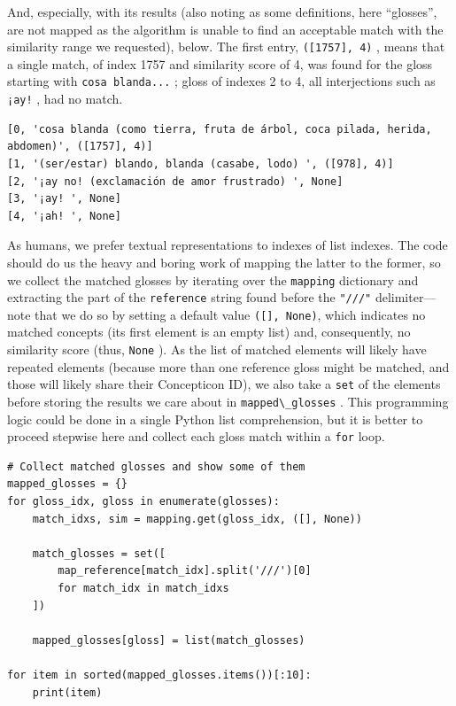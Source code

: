 \documentclass[
  a4paper,
  14pt,
  oneside,
  tablecaptionabove
]{scrbook}
\newcommand{\passthrough}[1]{#1}
\begin{document}
And, especially, with its results (also noting as some definitions, here
\enquote{glosses}, are not mapped as the algorithm is unable to find an
acceptable match with the similarity range we requested), below. The
first entry, \passthrough{\lstinline!([1757], 4)!} , means that a single
match, of index 1757 and similarity score of 4, was found for the gloss
starting with \passthrough{\lstinline!cosa blanda...!} ; gloss of
indexes 2 to 4, all interjections such as \passthrough{\lstinline"¡ay!"}
, had no match.

\begin{lstlisting}
[0, 'cosa blanda (como tierra, fruta de árbol, coca pilada, herida, abdomen)', ([1757], 4)]
[1, '(ser/estar) blando, blanda (casabe, lodo) ', ([978], 4)]
[2, '¡ay no! (exclamación de amor frustrado) ', None]
[3, '¡ay! ', None]
[4, '¡ah! ', None]
\end{lstlisting}

As humans, we prefer textual representations to indexes of list indexes.
The code should do us the heavy and boring work of mapping the latter to
the former, so we collect the matched glosses by iterating over the
\passthrough{\lstinline!mapping!} dictionary and extracting the part of
the \passthrough{\lstinline!reference!} string found before the
\passthrough{\lstinline!"///"!} delimiter--- note that we do so by
setting a default value \passthrough{\lstinline!([], None)!}, which
indicates no matched concepts (its first element is an empty list) and,
consequently, no similarity score (thus, \passthrough{\lstinline!None!}
). As the list of matched elements will likely have repeated elements
(because more than one reference gloss might be matched, and those will
likely share their Concepticon ID), we also take a
\passthrough{\lstinline!set!} of the elements before storing the results
we care about in \passthrough{\lstinline!mapped\_glosses!} . This
programming logic could be done in a single Python list comprehension,
but it is better to proceed stepwise here and collect each gloss match
within a \passthrough{\lstinline!for!} loop.

\begin{lstlisting}
# Collect matched glosses and show some of them
mapped_glosses = {}
for gloss_idx, gloss in enumerate(glosses):
    match_idxs, sim = mapping.get(gloss_idx, ([], None))

    match_glosses = set([
        map_reference[match_idx].split('///')[0]
        for match_idx in match_idxs
    ])

    mapped_glosses[gloss] = list(match_glosses)

for item in sorted(mapped_glosses.items())[:10]:
    print(item)
\end{lstlisting}
\end{document}
